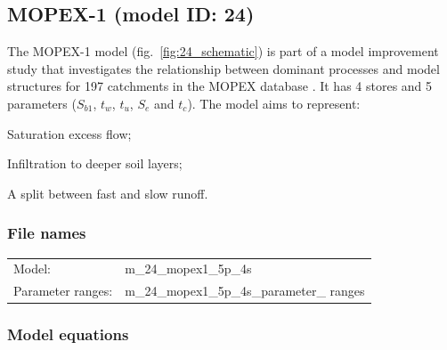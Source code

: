 \subsection{MOPEX-1 (model ID: 24)}
The MOPEX-1 model (fig.~\ref{fig:24_schematic}) is part of a model improvement study that investigates the relationship between dominant processes and model structures for 197 catchments in the MOPEX database \citep{Ye2012}. It has 4 stores and 5 parameters ($S_{b1}$, $t_w$, $t_u$, $S_e$ and $t_c$). The model aims to represent:

\begin{itemizecompact}
\item Saturation excess flow;
\item Infiltration to deeper soil layers;
\item A split between fast and slow runoff.
\end{itemizecompact}

\subsubsection{File names}
\begin{tabular}{@{}ll}
Model: &m\_24\_mopex1\_5p\_4s \\
Parameter ranges: &m\_24\_mopex1\_5p\_4s\_parameter\_ ranges \\
\end{tabular}

\subsubsection{Model equations}

